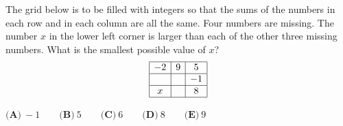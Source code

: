 The grid below is to be filled with integers so that the sums of the numbers in each row and in each column are all the same. Four numbers are missing. The number $x$ in the lower left corner is larger than each of the other three missing numbers. What is the smallest possible value of $x$?
\[\begin{array}{|c|c|c|}\hline -2&9&5\\\hline \ &\ &-1\\\hline x&\ &8\\\hline\end{array}\]

$\textbf{(A)}\ -1\qquad\textbf{(B)}\ 5\qquad\textbf{(C)}\ 6\qquad\textbf{(D)}\ 8\qquad\textbf{(E)}\ 9$
